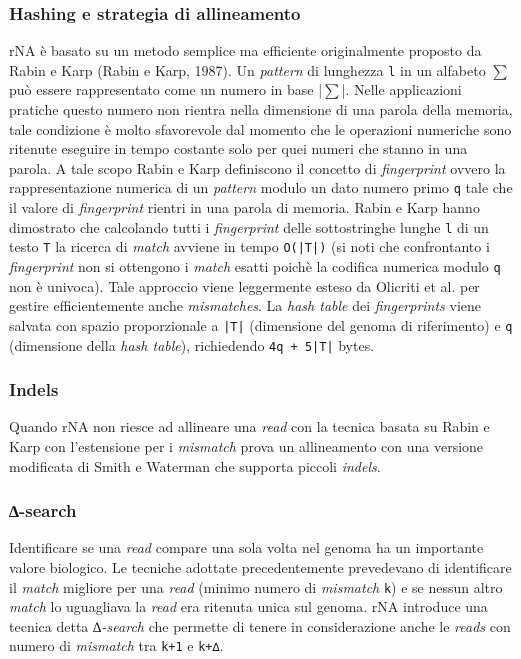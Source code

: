 \documentclass[conference]{IEEEtran}
\begin{document}
\subsubsection{Hashing e strategia di allineamento}
rNA è basato su un metodo semplice ma efficiente originalmente proposto da Rabin e Karp (Rabin e Karp, 1987). Un \textit{pattern} di lunghezza \texttt{l} in un alfabeto $\sum$ può essere rappresentato come un numero in base |$\sum$|. Nelle applicazioni pratiche questo numero non rientra nella dimensione di una parola della memoria, tale condizione è molto sfavorevole dal momento che le operazioni numeriche sono ritenute eseguire in tempo costante solo per quei numeri che stanno in una parola. A tale scopo Rabin e Karp definiscono il concetto di \textit{fingerprint} ovvero la rappresentazione numerica di un \textit{pattern} modulo un dato numero primo \texttt{q} tale che il valore di \textit{fingerprint} rientri in una parola di memoria. Rabin e Karp hanno dimostrato che calcolando tutti i \textit{fingerprint} delle sottostringhe lunghe \texttt{l} di un testo \texttt{T} la ricerca di \textit{match} avviene in tempo \texttt{O(|T|)} (si noti che confrontanto i \textit{fingerprint} non si ottengono i \textit{match} esatti poichè la codifica numerica modulo \texttt{q} non è univoca). Tale approccio viene leggermente esteso da Olicriti et al. per gestire efficientemente anche \textit{mismatches}. La \textit{hash table} dei \textit{fingerprints} viene salvata con spazio proporzionale a \texttt{|T|} (dimensione del genoma di riferimento) e \texttt{q} (dimensione della \textit{hash table}), richiedendo \texttt{4q + 5|T|} bytes.\\
\subsubsection{Indels}
Quando rNA non riesce ad allineare una \textit{read} con la tecnica basata su Rabin e Karp con l'estensione per i \textit{mismatch} prova un allineamento con una versione modificata di Smith e Waterman che supporta piccoli \textit{indels}.\\
\subsubsection{∆-search}
Identificare se una \textit{read} compare una sola volta nel genoma ha un importante valore biologico. Le tecniche adottate precedentemente prevedevano di identificare il \textit{match} migliore per una \textit{read} (minimo numero di \textit{mismatch} \texttt{k}) e se nessun altro \textit{match} lo uguagliava la \textit{read} era ritenuta unica sul genoma. rNA introduce una tecnica detta \textit{∆-search} che permette di tenere in considerazione anche le \textit{reads} con numero di \textit{mismatch} tra \texttt{k+1} e \texttt{k+∆}.\\
\end{document}
